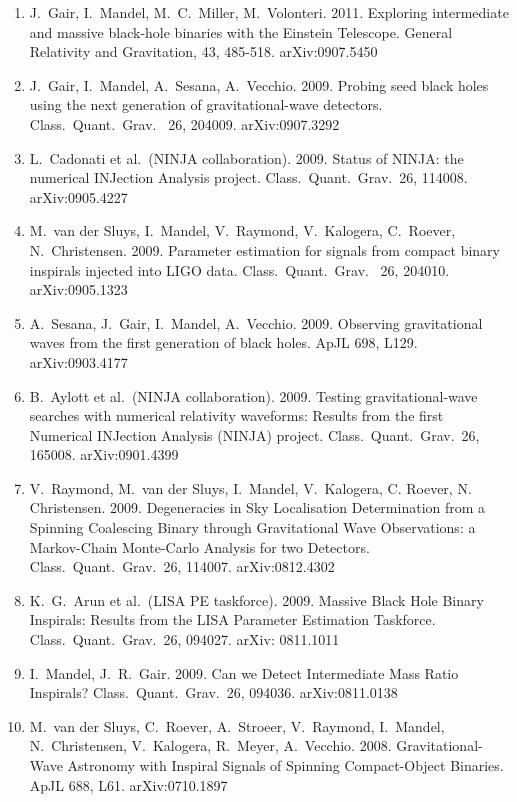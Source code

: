 \documentclass[margin,line]{res}
\begin{document}
\begin{resume}
\begin{enumerate}
\item  J.~Gair, I.~Mandel, M.~C.~Miller, M.~Volonteri.  2011.  Exploring intermediate and massive black-hole binaries with the Einstein Telescope. General Relativity and Gravitation, 43, 485-518.  arXiv:0907.5450

\item  J.~Gair, I.~Mandel, A.~Sesana, A.~Vecchio.  2009. Probing seed black holes using the next generation of gravitational-wave detectors.  Class.~Quant.~Grav.~ 26, 204009.  arXiv:0907.3292

\item  L.~Cadonati et al.~(NINJA collaboration). 2009. Status of NINJA: the numerical INJection Analysis project.  Class.~Quant.~Grav.~26, 114008. arXiv:0905.4227

\item  M.~van der Sluys, I.~Mandel, V.~Raymond, V.~Kalogera, C.~Roever, N.~Christensen. 2009. Parameter estimation for signals from compact binary inspirals injected into LIGO data.  Class.~Quant.~Grav.~ 26, 204010. arXiv:0905.1323

\item  A.~Sesana, J.~Gair, I.~Mandel, A.~Vecchio. 2009. Observing gravitational waves from the first generation of black holes.  ApJL 698, L129. arXiv:0903.4177 

\item  B.~Aylott et al.~(NINJA collaboration).  2009. Testing gravitational-wave searches with numerical relativity waveforms: Results from the first Numerical INJection Analysis (NINJA) project.  Class.~Quant.~Grav.~26, 165008.  arXiv:0901.4399

\item  V.~Raymond, M.~van der Sluys, I.~Mandel, V.~Kalogera, C. Roever, N. Christensen.  2009. Degeneracies in Sky Localisation Determination from a Spinning Coalescing Binary through Gravitational Wave Observations: a Markov-Chain Monte-Carlo Analysis for two Detectors. Class.~Quant.~Grav.~26, 114007.  arXiv:0812.4302

\item  K.~G.~Arun et al.~(LISA PE taskforce). 2009.  Massive Black Hole Binary Inspirals: Results from the LISA Parameter Estimation Taskforce.  Class.~Quant.~Grav.~26, 094027.  arXiv: 0811.1011

\item  I.~Mandel, J.~R.~Gair.  2009.  Can we Detect Intermediate Mass Ratio Inspirals?  Class.~Quant.~Grav.~26, 094036.  arXiv:0811.0138

\item  M.~van der Sluys, C.~Roever, A.~Stroeer, V.~Raymond, I.~Mandel, N.~Christensen, 
V.~Kalogera, R.~Meyer, A.~Vecchio. 2008.  Gravitational-Wave Astronomy with Inspiral Signals of Spinning Compact-Object Binaries.  ApJL 688, L61. arXiv:0710.1897


\end{enumerate}
\end{resume}
\end{document}
